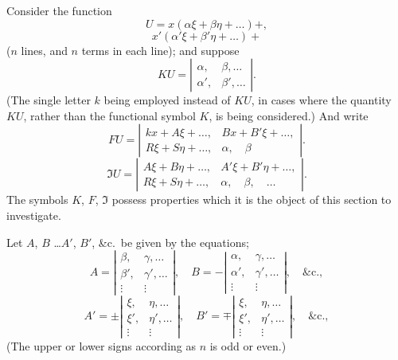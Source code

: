 \documentclass[11pt,a4paper]{book}
\begin{document}
Consider the function
\[
U = x(\alpha\xi + \beta\eta + \ldots) +
\tag{1},
\]
\[
x'(\alpha'\xi + \beta'\eta + \ldots) +
\]
($n$ lines, and $n$ terms in each line);
and suppose
\[
KU = \left|\begin{array}{cc}
\alpha, & \beta, \ldots \\
\alpha', & \beta', \ldots
\end{array}\right|
\tag{2}.
\]
(The single letter $k$ being employed instead of $KU$, in cases where the quantity $KU$,
rather than the functional symbol $K$, is being considered.) And write
\[
FU = \left|\begin{array}{cc}
kx + A\xi + \ldots, & Bx + B'\xi + \ldots, \\
R\xi + S\eta + \ldots, & \alpha, \quad \beta
\end{array}\right|
\tag{3}.
\]
\[
\mathfrak{I}U = \left|\begin{array}{cc}
A\xi + B\eta + \ldots, & A'\xi + B'\eta + \ldots, \\
R\xi + S\eta + \ldots, & \alpha, \quad \beta, \quad \ldots
\end{array}\right|
\tag{4}.
\]
The symbols $K$, $F$, $\mathfrak{I}$ possess properties which it is the object of this section to
investigate.

\newpage
Let $A$, $B$ \ldots $A'$, $B'$, \&c.\ be given by the equations;
\[
A = \left|\begin{array}{cc}
\beta, & \gamma, \ldots \\
\beta', & \gamma', \ldots \\
\vdots & \vdots
\end{array}\right|, \quad
B = -\left|\begin{array}{cc}
\alpha, & \gamma, \ldots \\
\alpha', & \gamma', \ldots \\
\vdots & \vdots
\end{array}\right|, \quad \&\text{c.},
\]
\[
A' = \pm\left|\begin{array}{cc}
\xi, & \eta, \ldots \\
\xi', & \eta', \ldots \\
\vdots & \vdots
\end{array}\right|, \quad
B' = \mp\left|\begin{array}{cc}
\xi, & \eta, \ldots \\
\xi', & \eta', \ldots \\
\vdots & \vdots
\end{array}\right|, \quad \&\text{c.},
\]
(The upper or lower signs according as $n$ is odd or even.)
\end{document}
